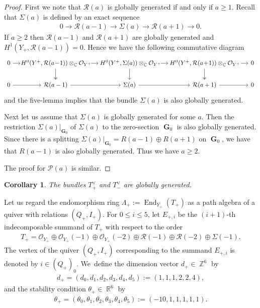\documentclass[pdftex]{sigma}
\DeclareMathOperator{\CC}{\mathbb{C}}
\DeclareMathOperator{\End}{End}
\DeclareMathOperator{\G}{\mathbf{G}}
\DeclareMathOperator{\RR}{\mathbb{R}}
\DeclareMathOperator{\ZZ}{\mathbb{Z}}
\newcommand{\stsh}{\mathcal{O}}
\numberwithin{equation}{section}
\newtheorem{Corollary}[Theorem]{Corollary}
\begin{document}
\begin{proof}
First we note that $\mathcal{R}(a)$ is globally generated if and only if $a \geq 1$.
Recall that $\Sigma(a)$ is defined by an exact sequence
\begin{gather*}
0 \to \mathcal{R}(a-1) \to \Sigma(a) \to \mathcal{R}(a+1) \to 0.
\end{gather*}
If $a \geq 2$ then $\mathcal{R}(a-1)$ and $\mathcal{R}(a+1)$ are globally generated and $H^1(Y_+, \mathcal{R}(a-1)) = 0$.
Hence we have the following commutative diagram
$$\begin{tikzcd}[column sep = small]
0 \rar&[0em]\!\! H^0(Y^+, \mathcal{R}(a\!-\!1)) \otimes_{\CC} \stsh_{Y^+} \!\rar\! \!\arrow[d, twoheadrightarrow] &[0em]\! H^0(Y^+, \Sigma(a)) \otimes_{\CC} \stsh_{Y^+} \!\rar \!\!\arrow[d] &[0em]
\!H^0(Y^+, \mathcal{R}(a\!+\!1)) \otimes_{\CC} \stsh_{Y^+} \!\rar \!\arrow[d, twoheadrightarrow] &[0em] 0
\\
0 \arrow[r] & \mathcal{R}(a-1) \arrow[r] & \Sigma(a) \arrow[r] &\mathcal{R}(a+1) \arrow[r] & 0
\end{tikzcd}
$$
and the five-lemma implies that the bundle $\Sigma(a)$ is also globally generated.

Next let us assume that $\Sigma(a)$ is globally generated for some $a$.
Then the restriction $\Sigma(a)|_{\G_0}$ of $\Sigma(a)$ to the zero-section $\G_0$ is also globally generated.
Since there is a splitting $\Sigma(a)|_{\G_0} = R(a-1) \oplus R(a+1)$ on $\G_0$, we have that $R(a-1)$ is also globally generated.
Thus we have $a \geq 2$.

The proof for $\mathcal{P}(a)$ is similar.
\end{proof}

\begin{Corollary}
The bundles $T_+^{\vee}$ and $T_-^{\vee}$ are globally generated.
\end{Corollary}

Let us regard the endomorphism ring $\Lambda_+ := \End_{Y_+}(T_+)$ as a path algebra of a quiver with relations $(Q_+, I_+)$.
For $0 \leq i \leq 5$, let $E_{+, i}$ be the $(i+1)$-th indecomposable summand of $T_+$ with respect to the order
\begin{gather*}
T_+ = \stsh_{Y_+} \oplus \stsh_{Y_+}(-1) \oplus \stsh_{Y_+}(-2) \oplus \mathcal{R}(-1) \oplus \mathcal{R}(-2) \oplus \Sigma(-1).
\end{gather*}
The vertex of the quiver $(Q_+, I_+)$ corresponding to the summand $E_{+, i}$ is denoted by $i \in (Q_+)_0$.
We~define the dimension vector $d_+ \in \ZZ^{6}$ by
\begin{gather*}
d_+ = (d_0, d_1, d_2, d_3, d_4, d_5) := (1,1,1,2,2,4),
\end{gather*}
and the stability condition $\theta_+ \in \RR^{6}$ by
\begin{gather*}
\theta_+ = (\theta_0, \theta_1, \theta_2, \theta_3, \theta_4, \theta_5) := (-10, 1,1,1,1,1).
\end{gather*}
\end{document}
